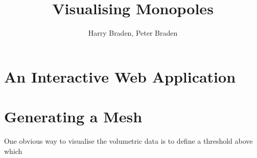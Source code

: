 \documentclass{article}
\title{Visualising Monopoles}
\author{Harry Braden, Peter Braden}
\begin{document}
\maketitle

\begin{abstract}

\end{abstract}


\section{An Interactive Web Application}

\section{Generating a Mesh}
One obvious way to visualise the volumetric data is to define a threshold above
which 
\end{document}

